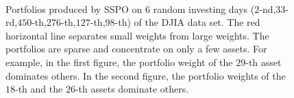 \documentclass[twoside,11pt]{article}
\begin{document}
\begin{figure}[!htb]
\centering
{}
\\
\caption{Portfolios produced by SSPO on $6$ random investing days ($2$-nd,$33$-rd,$450$-th,$276$-th,$127$-th,$98$-th) of the DJIA data set. The red horizontal line separates small weights from large weights. The portfolios are sparse and concentrate on only a few assets. For example, in the first figure, the portfolio weight of the $29$-th asset dominates others. In the second figure, the portfolio weights of the $18$-th and the $26$-th assets dominate others.}
\label{fig:sparsity}
\end{figure}
\end{document}
